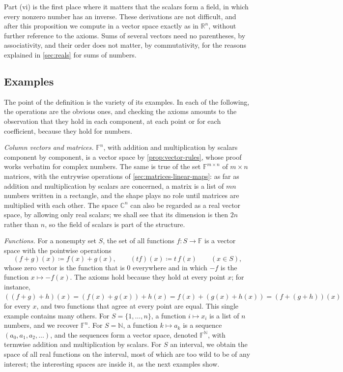 Part (vi) is the first place where it matters that the scalars form a field, in which every nonzero number has an inverse. These derivations are not difficult, and after this proposition we compute in a vector space exactly as in $\mathbb R^n$, without further reference to the axioms. Sums of several vectors need no parentheses, by associativity, and their order does not matter, by commutativity, for the reasons explained in \cref{sec:reals} for sums of numbers.

\subsection{Examples}

The point of the definition is the variety of its examples. In each of the following, the operations are the obvious ones, and checking the axioms amounts to the observation that they hold in each component, at each point or for each coefficient, because they hold for numbers.

\emph{Column vectors and matrices.} $\mathbb F^n$, with addition and multiplication by scalars component by component, is a vector space by \cref{prop:vector-rules}, whose proof works verbatim for complex numbers. The same is true of the set $\mathbb F^{m\times n}$ of $m\times n$ matrices, with the entrywise operations of \cref{sec:matrices-linear-maps}: as far as addition and multiplication by scalars are concerned, a matrix is a list of $mn$ numbers written in a rectangle, and the shape plays no role until matrices are multiplied with each other. The space $\mathbb C^n$ can also be regarded as a real vector space, by allowing only real scalars; we shall see that its dimension is then $2n$ rather than $n$, so the field of scalars is part of the structure.

\emph{Functions.} For a nonempty set $S$, the set of all functions $f\colon S\to\mathbb F$ is a vector space with the pointwise operations
\[
(f+g)(x)\coloneqq f(x)+g(x),\qquad(tf)(x)\coloneqq t\,f(x)\qquad(x\in S),
\]
whose zero vector is the function that is $0$ everywhere and in which $-f$ is the function $x\mapsto-f(x)$. The axioms hold because they hold at every point $x$; for instance, $((f+g)+h)(x)=(f(x)+g(x))+h(x)=f(x)+(g(x)+h(x))=(f+(g+h))(x)$ for every $x$, and two functions that agree at every point are equal. This single example contains many others. For $S=\{1,\ldots,n\}$, a function $i\mapsto x_i$ is a list of $n$ numbers, and we recover $\mathbb F^n$. For $S=\mathbb N$, a function $k\mapsto a_k$ is a sequence $(a_0,a_1,a_2,\ldots)$, and the sequences form a vector space, denoted $\mathbb F^{\mathbb N}$, with termwise addition and multiplication by scalars. For $S$ an interval, we obtain the space of all real functions on the interval, most of which are too wild to be of any interest; the interesting spaces are inside it, as the next examples show.

